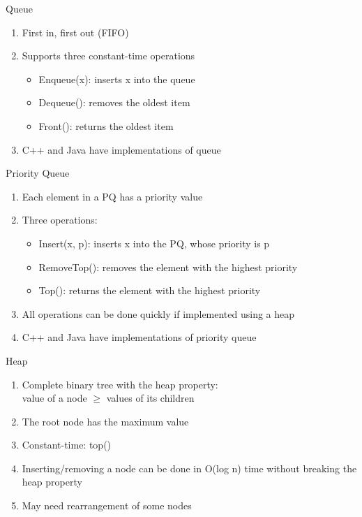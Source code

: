 \documentclass{beamer}
\begin{document}
\begin{frame}[<+->]{Queue}
\begin{enumerate}
  \item First in, first out (FIFO)
  \item Supports three constant-time operations\\
  \begin{itemize}
    \item Enqueue(x): inserts x into the queue
    \item Dequeue(): removes the oldest item
    \item Front(): returns the oldest item
  \end{itemize}
  \item C++ and Java have implementations of queue
\end{enumerate}
\end{frame}

\begin{frame}[<+->]{Priority Queue}
\begin{enumerate}
  \item Each element in a PQ has a priority value
  \item Three operations:\\
  \begin{itemize}
    \item Insert(x, p): inserts x into the PQ, whose priority is p
    \item RemoveTop(): removes the element with the highest priority
    \item Top(): returns the element with the highest priority
  \end{itemize}
  \item All operations can be done quickly if implemented using a heap
  \item C++ and Java have implementations of priority queue
\end{enumerate}
\end{frame}

\begin{frame}[<+->]{Heap}
\begin{enumerate}
  \item Complete binary tree with the heap property:\\
    value of a node $\geq$ values of its children
  \item The root node has the maximum value
  \item Constant-time: top()
  \item Inserting/removing a node can be done in O(log n) time without breaking the heap property
  \item May need rearrangement of some nodes
\end{enumerate}
\end{frame}
\end{document}
